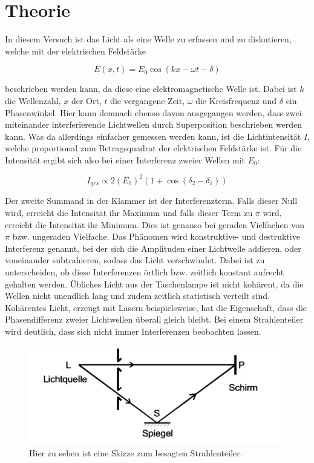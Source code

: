\section{Theorie}
\label{sec:Theorie}

In diesem Versuch ist das Licht als eine Welle zu erfassen und zu diskutieren, welche mit der elektrischen Feldstärke 

\begin{equation}
    E(x,t) = E_0 \cos(kx-\omega t - \delta)
\end{equation}

beschrieben werden kann, da diese eine elektromagnetische Welle ist. Dabei ist \(k\) die Wellenzahl, \(x\) der Ort, \(t\) die vergangene Zeit, \(\omega\) die Kreisfrequenz und \(\delta\) ein Phasenwinkel. Hier kann demnach ebenso davon ausgegangen werden, dass zwei miteinander interferierende Lichtwellen durch Superposition beschrieben werden kann. Was da allerdings einfacher gemessen werden kann, ist die Lichtintensität \(I\), welche proportional zum Betragsquadrat der elektrischen Feldstärke ist. Für die Intensität ergibt sich also bei einer Interferenz zweier Wellen mit \(E_0\):

\begin{equation}
    I_{ges} \propto 2(E_0)^2(1+\cos(\delta_2 - \delta_1))
\end{equation}

Der zweite Summand in der Klammer ist der Interferenzterm. Falls dieser Null wird, erreicht die Intensität ihr Maximum und falls dieser Term zu \(\pi\) wird, erreicht die Intensität ihr Minimum. Dies ist genauso bei geraden Vielfachen von \(\pi\) bzw. ungeraden Vielfache. Das Phänomen wird konstruktive- und destruktive Interferenz genannt, bei der sich die Amplituden einer Lichtwelle addieren, oder voneinander subtrahieren, sodass das Licht verschwindet. Dabei ist zu unterscheiden, ob diese Interferenzen örtlich bzw. zeitlich konstant aufrecht gehalten werden. Übliches Licht aus der Taschenlampe ist nicht kohärent, da die Wellen nicht unendlich lang und zudem zeitlich statistisch verteilt sind. Kohärentes Licht, erzeugt mit Lasern beispielsweise, hat die Eigenschaft, dass die Phasendifferenz zweier Lichtwellen überall gleich bleibt. Bei einem Strahlenteiler wird deutlich, dass sich nicht immer Interferenzen beobachten lassen. 

\begin{figure}
    \centering
    \includegraphics[scale = 0.5]{content/Strahlenteiler.pdf}
    \caption{Hier zu sehen ist eine Skizze zum besagten Strahlenteiler.}
    \label{fig:Teiler}
\end{figure}

